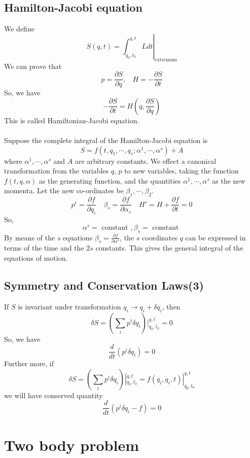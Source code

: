 \section{Hamilton-Jacobi equation}
We define
\[S(q,t)=\left. \int_{q_0,t_0}^{q,t} L dt\right|_{\mathrm{extremum}}\]
We can prove that
\[p = \frac{\partial S}{\partial q}, \ \ \ \ H = -\frac{\partial S}{\partial t}\]
So, we have
\[-\frac{\partial S}{\partial t} = H (q,\frac{\partial S}{\partial q})\]
This is called Hamiltonian-Jacobi equation.\\ \\
Suppose the complete integral of the Hamilton-Jacobi equation is
\[S=f(t,q_1,\cdots,q_s;\alpha^1,\cdots,\alpha^s)+A\]
where $\alpha^1,\cdots,\alpha^s$ and $A$ are arbitrary constants. We effect a canonical transformation from the
variables $q$, $p$ to new variables, taking the function $f(t,q,\alpha)$ as the generating function, and the quantities $\alpha^1,\cdots,\alpha^s$ as the new momenta.
Let the new co-ordinates be $\beta_1,\cdots,\beta_2$.
\[p^i = \frac{\partial f}{\partial q_i} \quad \beta_s = \frac{\partial f}{\partial \alpha_s} \quad H' = H + \frac{\partial f}{\partial t} =0\]
So,
\[\alpha^s = \mbox{ constant }, \beta_s = \mbox{ constant }\]
By means of the $s$ equations $\beta_s = \frac{\partial f}{\partial \alpha^s}$, the $s$ coordinates $q$ can be expressed in terms of the time and the $2s$ constants. This gives the general integral of the equations of motion.

\section{Symmetry and Conservation Laws(3)}
If $S$ is invariant under transformation
$q_i \rightarrow q_i + \delta q_i$, then 
\[\delta S = (\sum_i p^i \delta q_i) |_{q_0,t_0}^{q,t} = 0\]
So, we have
\[\frac{d}{dt} (p^i \delta q_i) = 0\]
Further more, if
\[\delta S = (\sum_i p^i \delta q_i) |_{q_0,t_0}^{q,t} =  f(q_i,\dot{q}_i,t)|_{q_0,t_0}^{q,t}\]
we will have conserved quantity
\[\frac{d}{dt} (p^i \delta q_i -f) = 0\]

\chapter{Two body problem}

